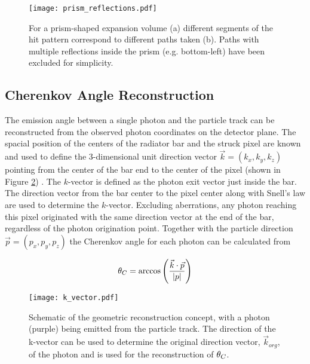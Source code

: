 \begin{figure}[H]
	\centering
	\texttt{[image: prism\_reflections.pdf]}
	\caption{For a prism-shaped expansion volume (a) different segments of the hit pattern correspond to different paths taken (b). Paths with multiple reflections inside the prism (e.g. bottom-left) have been excluded for simplicity.}
	\label{fig:prism_reflections}
\end{figure}

\subsection{Cherenkov Angle Reconstruction}
The emission angle between a single photon and the particle track can be reconstructed from the observed photon coordinates on the detector plane. The spacial position of the centers of the radiator bar and the struck pixel are known and used to define the 3-dimensional unit direction vector $\vec{k} = (k_x, k_y, k_z)$ pointing from the center of the bar end to the center of the pixel (shown in Figure \ref{fig:k_vector}) . The $k$-vector is defined as the photon exit vector just inside the bar. The direction vector from the bar center to the pixel center along with Snell's law are used to determine the $k$-vector. Excluding aberrations, any photon reaching this pixel originated with the same direction vector at the end of the bar, regardless of the photon origination point. Together with the particle direction $\vec{p} = (p_x, p_y, p_z)$ the Cherenkov angle for each photon can be calculated from

\begin{equation}
	\theta_{C} = \arccos\left(\frac{\vec{k}\cdot\vec{p}}{|p|}\right)
\end{equation}

\begin{figure}[!htb]
	\centering
	\texttt{[image: k\_vector.pdf]}
	\caption{Schematic of the geometric reconstruction concept, with a photon (purple) being emitted from the particle track. The direction of the k-vector can be used to determine the original direction vector, $\vec{k}_{org}$, of the photon and is used for the reconstruction of $\theta_{C}$.}
	\label{fig:k_vector}
\end{figure}

